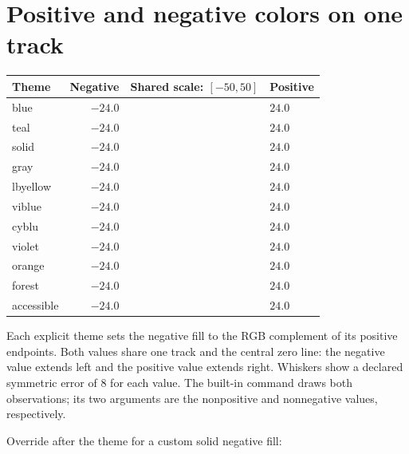 \documentclass{article}
\begin{document}
\section*{Positive and negative colors on one track}
\renewcommand{\arraystretch}{1.8}
\newcommand{\themerow}[1]{#1 & $-24.0$ & \gradsignedbar[theme=#1,label=none]{-24}{24} & $24.0$\\}
\begin{tabular}{lrcl}
Theme & Negative & Shared scale: $[-50,50]$ & Positive\\\hline
\themerow{blue}
\themerow{teal}
\themerow{solid}
\themerow{gray}
\themerow{lbyellow}
\themerow{viblue}
\themerow{cyblu}
\themerow{violet}
\themerow{orange}
\themerow{forest}
\themerow{accessible}
\end{tabular}
\par\medskip
Each explicit theme sets the negative fill to the RGB complement of its
positive endpoints. Both values share one track and the central zero line:
the negative value extends left and the positive value extends right.
Whiskers show a declared symmetric error of 8 for each value.
The built-in \texttt{\string\gradsignedbar} command draws both observations;
its two arguments are the nonpositive and nonnegative values, respectively.
\par\medskip
Override after the theme for a custom solid negative fill:
\par\smallskip
{}
\end{document}
